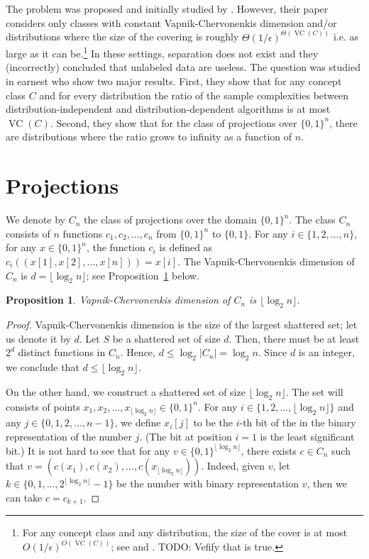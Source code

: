 \documentclass[10pt]{article}
\newtheorem{proposition}{Proposition}
\DeclareMathOperator{\VC}{VC}
\begin{document}
The problem was proposed and initially studied by \cite{Ben-David-Lu-Pal-2008}.
However, their paper considers only classes with constant Vapnik-Chervonenkis
dimension and/or distributions where the size of the covering is roughly
$\Theta(1/\epsilon)^{\Theta(\VC(C))}$ i.e. as large as it can be.\footnote{For
any concept class and any distribution, the size of the cover is at most
$O(1/\epsilon)^{O(\VC(C))}$; see \cite[Chapter 4]{Devroye-Lugosi-2000} and
\cite{Haussler-1995}. TODO: Vefify that is true.} In these settings, separation
does not exist and they (incorrectly) concluded that unlabeled data are useless.
The question was studied in earnest \cite{Darnstadt-Simon-Szorenyi-2013} who
show two major results. First, they show that for any concept class $C$ and for
every distribution the ratio of the sample complexities between
distribution-independent and distribution-dependent algorithms is at most
$\VC(C)$. Second, they show that for the class of projections over $\{0,1\}^n$,
there are distributions where the ratio grows to infinity as a function of $n$.

\section{Projections}

We denote by $C_n$ the class of projections over the domain $\{0,1\}^n$. The
class $C_n$ consists of $n$ functions $c_1, c_2, \dots, c_n$ from $\{0,1\}^n$ to
$\{0,1\}$. For any $i \in \{1,2,\dots,n\}$, for any $x \in \{0,1\}^n$,
the function $c_i$ is defined as $c_i((x[1], x[2], \dots, x[n])) = x[i]$.
The Vapnik-Chervonenkis dimension of $C_n$ is $d = \lfloor \log_2 n \rfloor$; see
Proposition~\ref{proposition:vc-dimension-projections} below.

\begin{proposition}
\label{proposition:vc-dimension-projections}
Vapnik-Chervonenkis dimension of $C_n$ is $\lfloor \log_2 n \rfloor$.
\end{proposition}

\begin{proof}
Vapnik-Chervonenkis dimension is the size of the largest shattered set; let us
denote it by $d$. Let $S$ be a shattered set of size $d$. Then, there must be at
least $2^d$ distinct functions in $C_n$. Hence, $d \le \log_2 |C_n| =
\log_2 n$. Since $d$ is an integer, we conclude that $d \le \lfloor \log_2 n
\rfloor$.

On the other hand, we construct a shattered set of size $\lfloor \log_2 n
\rfloor$. The set will consists of points $x_1, x_2, \dots, x_{\lfloor \log_2 n
\rfloor} \in \{0,1\}^n$. For any $i \in \{1,2,\dots,\lfloor \log_2 n \rfloor\}$
and any $j \in \{0,1,2,\dots,n-1\}$, we define $x_i[j]$ to be the $i$-th bit of the
in the binary representation of the number $j$. (The bit at position $i=1$ is the
least significant bit.) It is not hard to see that for any $v \in
\{0,1\}^{\lfloor \log_2 n \rfloor}$, there exists $c \in C_n$ such that $v =
(c(x_1), c(x_2), \dots, c(x_{\lfloor \log_2 n \rfloor}))$. Indeed, given $v$,
let $k \in \{0,1,\dots,2^{\lfloor \log_2 n \rfloor} - 1\}$ be the number with
binary representation $v$, then we can take $c = c_{k+1}$.
\end{proof}
\end{document}

